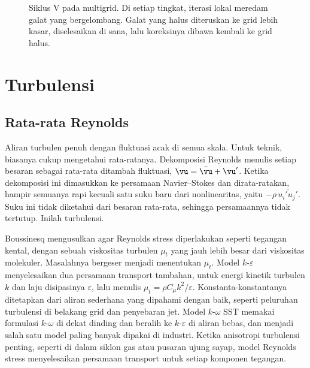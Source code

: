 \begin{figure}[ht]
\centering
{}
\caption{Siklus V pada multigrid. Di setiap tingkat, iterasi lokal meredam galat yang bergelombang. Galat yang halus
diteruskan ke grid lebih kasar, diselesaikan di sana, lalu koreksinya dibawa kembali ke grid halus.}
\label{fig:vcycle}
\end{figure}

\section{Turbulensi}

\subsection{Rata-rata Reynolds}

Aliran turbulen penuh dengan fluktuasi acak di semua skala. Untuk teknik, biasanya cukup mengetahui
rata-ratanya. Dekomposisi Reynolds menulis setiap besaran sebagai rata-rata ditambah fluktuasi,
$\vu=\bar{\vu}+\vu'$. Ketika dekomposisi ini dimasukkan ke persamaan Navier--Stokes dan dirata-ratakan,
hampir semuanya rapi kecuali satu suku baru dari nonlinearitas, yaitu 
$-\rho\,\overline{u_i'u_j'}$. Suku ini tidak diketahui dari besaran rata-rata, sehingga persamaannya
tidak tertutup. Inilah  turbulensi.

Boussinesq mengusulkan agar Reynolds stress diperlakukan seperti tegangan kental, dengan sebuah
viskositas turbulen $\mu_t$ yang jauh lebih besar dari viskositas molekuler. Masalahnya bergeser
menjadi menentukan $\mu_t$. Model $k$-$\varepsilon$ \citep{launder1974} menyelesaikan dua persamaan
transport tambahan, untuk energi kinetik turbulen $k$ dan laju disipasinya $\varepsilon$, lalu menulis
$\mu_t=\rho C_\mu k^2/\varepsilon$. Konstanta-konstantanya ditetapkan dari aliran sederhana yang
dipahami dengan baik, seperti peluruhan turbulensi di belakang grid dan penyebaran jet. Model
$k$-$\omega$ SST \citep{menter1994} memakai formulasi $k$-$\omega$ di dekat dinding dan beralih ke
$k$-$\varepsilon$ di aliran bebas, dan menjadi salah satu model paling banyak dipakai di industri.
Ketika anisotropi turbulensi penting, seperti di dalam siklon gas atau pusaran ujung sayap, model
Reynolds stress menyelesaikan persamaan transport untuk setiap komponen tegangan.


